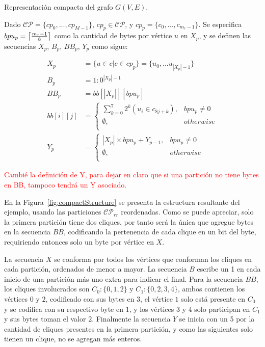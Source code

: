 \begin{definition} 
	\label{def:sequences}
	Representación compacta del grafo $G(V, E)$. 
	
	Dado $\mathcal{C}\mathcal{P} = \{cp_{0},...,cp_{M-1}\}$, $cp_{p} \in \mathcal{C}\mathcal{P}$, y $cp_{p}=\{c_{0},...,c_{m_{r}-1}\}$. 
	Se especifica $bpu_{p} = \ceil*{\frac{m_{r}-1}{8}}$ como la cantidad de bytes por vértice $u$ en $X_{p}$, y se definen las secuencias $X_{p}$, $B_{p}$, $BB_{p}$, $Y_{p}$ como sigue:
	
	\begin{align}
		X_{p} &= \{u \in c|c \in cp_{p}\} = \{u_{0},...u_{|X_{p}|-1}\} \\
		B_{p} &= 1:0^{|X_{p}|-1} \\
		BB_{p} &= bb[|X_{p}|][bpu_{p}]   \label{eq:bbp} \\
		bb[i][j] &= \begin{cases}
                  \sum_{k=0}^{7} 2^{k}(u_{i} \in c_{8j+k}), & bpu_{p} \neq 0  \\
                  \emptyset, & otherwise \\
                 \end{cases} \nonumber \\
		Y_{p} &= \begin{cases}
				|X_{p}|\times bpu_{p} + Y_{p-1}, & bpu_{p} \neq 0  \\
				 \emptyset, & otherwise \\
			\end{cases}
	\end{align}
\end{definition}

\textcolor{red}{Cambié la definición de Y, para dejar en claro que si una partición no tiene bytes en BB, tampoco tendrá un Y asociado.}

En la Figura~\ref{fig:compactStructure} se presenta la estructura resultante del ejemplo, usando las particiones $\mathcal{C}\mathcal{P}_{rr}$ reordenadas. Como se puede apreciar, solo la primera partición tiene dos cliques, por tanto será la única que agregue bytes en la secuencia $BB$, codificando la pertenencia de cada clique en un bit del byte, requiriendo entonces solo un byte por vértice en $X$.

La secuencia $X$ se conforma por todos los vértices que conforman los cliques en cada partición, ordenados de menor a mayor. La secuencia $B$ escribe un 1 en cada inicio de una partición más uno extra para indicar el final. Para la secuencia $BB$, los cliques involucrados son $C_{0}: \{0, 1, 2\}$ y $C_{1}: \{0, 2, 3, 4\}$, ambos contienen los vértices $0$ y $2$, codificado con sus bytes en $3$, el vértice $1$ solo está presente en $C_{0}$ y se codifica con su respectivo byte en $1$, y los vértices $3$ y $4$ solo participan en $C_{1}$ y sus bytes toman el valor $2$. Finalmente la secuencia $Y$ se inicia con un  5 por la cantidad de cliques presentes en la primera partición, y como las siguientes solo tienen un clique, no se agregan más enteros.

